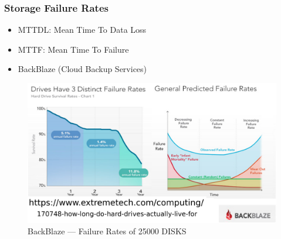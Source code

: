 \documentclass[aspectratio=169, xcolor=table, notheorems, hyperref={pdfpagelabels=false}]{beamer}
\begin{document}
\begin{frame}
\frametitle{Storage Failure Rates}
\begin{itemize}
\item MTTDL: Mean Time To Data Loss
\item MTTF: Mean Time To Failure
\item BackBlaze (Cloud Backup Services)
\end{itemize}
\begin{figure}
\includegraphics[width=0.60\linewidth]{os-extreme-tech}
\caption{BackBlaze --- Failure Rates of 25000 DISKS}
\end{figure}
\end{frame}

\end{document}
